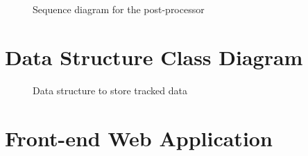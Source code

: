 \begin{figure}[H]
  \centering
  \caption[Post-processor sequence diagram]{Sequence diagram for the post-processor}
  \label{fig:sequence-diagram-post-processor}
\end{figure}

\vspace*{\fill}

\newpage

\section{Data Structure Class Diagram}


\vspace*{\fill}

\begin{figure}[H]
  \centering
  \caption[Tracked data structure]{Data structure to store tracked data}
  \label{fig:tracked-data-uml-class}
\end{figure}

\vspace*{\fill}

\newpage

\section{Front-end Web Application}

